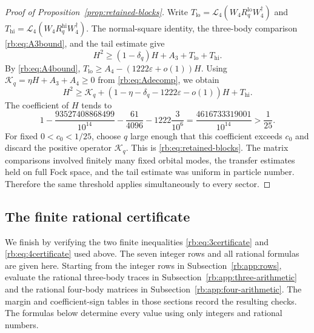 \begin{proof}[Proof of Proposition~\ref{prop:retained-blocks}]
Write $T_{\mathrm{lo}}=\mathcal L_4(W_4R_q^{\mathrm{lo}}W_4^\dagger)$
and $T_{\mathrm{hi}}=\mathcal L_4(W_4R_q^{\mathrm{hi}}W_4^\dagger)$.
The normal-square identity, the three-body comparison
\eqref{rb:eq:A3bound}, and the tail estimate give
\[
 H^2\ge (1-\delta_q)H+A_3+T_{\mathrm{lo}}+T_{\mathrm{hi}}.
\]
By \eqref{rb:eq:A4bound},
$T_{\mathrm{lo}}\ge A_4-(1222\varepsilon+o(1))H$.
Using $\mathcal K_q=\eta H+A_3+A_4\ge0$ from
\eqref{rb:eq:Adecomp}, we obtain
\[
 H^2\ge\mathcal K_q+
 (1-\eta-\delta_q-1222\varepsilon-o(1))H+T_{\mathrm{hi}}.
\]
The coefficient of $H$ tends to
\begin{equation}\label{rb:eq:finalmargin}
 1-\frac{93527408868499}{10^{14}}-\frac{61}{4096}
   -1222\frac3{10^6}
 =\frac{4616733319001}{10^{14}}>\frac1{25}.
\end{equation}
For fixed $0<c_0<1/25$, choose $q$ large enough that this coefficient
exceeds $c_0$ and discard the positive operator $\mathcal K_q$.
This is \eqref{rb:eq:retained-blocks}. The matrix comparisons involved
finitely many fixed orbital modes, the transfer estimates held on full
Fock space, and the tail estimate was uniform in particle number.
Therefore the same threshold applies simultaneously to every sector.
\end{proof}


\subsection{The finite rational certificate}
\label{rb:app:certificate}
We finish by verifying the two finite inequalities
\eqref{rb:eq:3certificate} and \eqref{rb:eq:4certificate} used above.
The seven integer rows and all rational formulas are given here.
Starting from the integer
rows in Subsection~\ref{rb:app:rows}, evaluate the rational three-body traces in
Subsection~\ref{rb:app:three-arithmetic} and the rational four-body matrices in
Subsection~\ref{rb:app:four-arithmetic}. The margin and coefficient-sign tables in
those sections record the resulting checks. The formulas below determine
every value using only integers and rational numbers.

